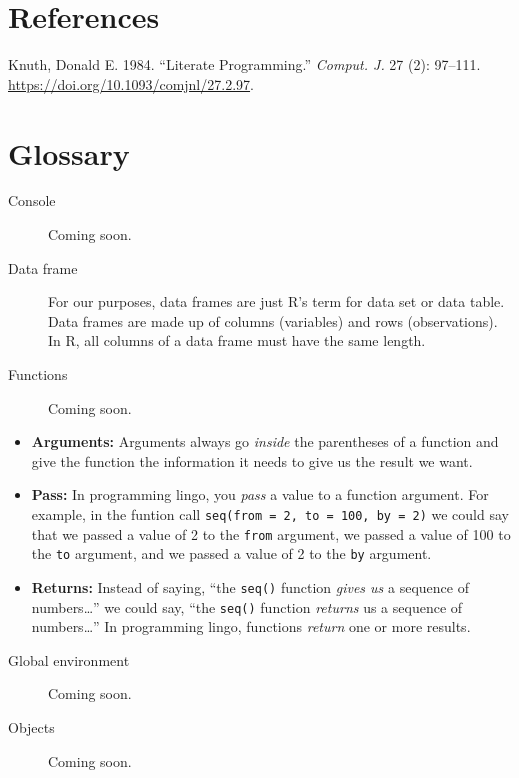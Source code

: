 \documentclass[
  a4paper,
  DIV=11,
  numbers=noendperiod,
  oneside,
  open=any]{scrreprt}
\newlength{\cslhangindent}
\newenvironment{CSLReferences}[2] %
 {\begin{list}{}{%
  \setlength{\itemindent}{0pt}
  \setlength{\leftmargin}{0pt}
  \setlength{\parsep}{0pt}
  \ifodd #1
   \setlength{\leftmargin}{\cslhangindent}
   \setlength{\itemindent}{-1\cslhangindent}
  \fi
  \setlength{\itemsep}{#2\baselineskip}}}
 {\end{list}}
\begin{document}

\chapter*{References}\label{references}


\label{refs}
\begin{CSLReferences}{1}{0}
Knuth, Donald E. 1984. {``Literate Programming.''} \emph{Comput. J.} 27
(2): 97--111. \url{https://doi.org/10.1093/comjnl/27.2.97}.

\end{CSLReferences}

\cleardoublepage
{}
{}
\appendix

\chapter{Glossary}\label{sec-glossary}

\begin{description}
\item[\label{glossary-console}{Console}]
Coming soon.
\item[\label{glossary-data-frame}{Data frame}]
For our purposes, data frames are just R's term for data set or data
table. Data frames are made up of columns (variables) and rows
(observations). In R, all columns of a data frame must have the same
length.
\item[\label{glossary-functions}{Functions}]
Coming soon.
\end{description}

\begin{itemize}
\item
  \textbf{Arguments:} Arguments always go \emph{inside} the parentheses
  of a function and give the function the information it needs to give
  us the result we want.
\item
  \textbf{Pass:} In programming lingo, you \emph{pass} a value to a
  function argument. For example, in the funtion call
  \texttt{seq(from\ =\ 2,\ to\ =\ 100,\ by\ =\ 2)} we could say that we
  passed a value of 2 to the \texttt{from} argument, we passed a value
  of 100 to the \texttt{to} argument, and we passed a value of 2 to the
  \texttt{by} argument.
\item
  \textbf{Returns:} Instead of saying, ``the \texttt{seq()} function
  \emph{gives us} a sequence of numbers\ldots{}'' we could say, ``the
  \texttt{seq()} function \emph{returns} us a sequence of
  numbers\ldots{}'' In programming lingo, functions \emph{return} one or
  more results.
\end{itemize}

\begin{description}
\item[\label{glossary-global-environment}{Global
environment}]
Coming soon.
\item[\label{glossary-objects}{Objects}]
Coming soon.
\end{description}
\end{document}
